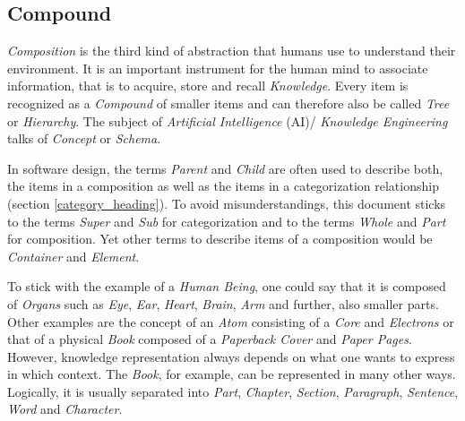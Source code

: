 %
%
%
%
%
%
%

\subsection{Compound}
\label{compound_heading}

\emph{Composition} is the third kind of abstraction that humans use to understand
their environment. It is an important instrument for the human mind to associate
information, that is to acquire, store and recall \emph{Knowledge}. Every item is
recognized as a \emph{Compound} of smaller items and can therefore also be called
\emph{Tree} or \emph{Hierarchy}. The subject of \emph{Artificial Intelligence} (AI)/
\emph{Knowledge Engineering} talks of \emph{Concept} or \emph{Schema}.

In software design, the terms \emph{Parent} and \emph{Child} are often used to
describe both, the items in a composition as well as the items in a categorization
relationship (section \ref{category_heading}).
To avoid misunderstandings, this document sticks to the terms \emph{Super} and
\emph{Sub} for categorization and to the terms \emph{Whole} and \emph{Part}
\cite{sowa} for composition. Yet other terms to describe items of a composition
would be \emph{Container} and \emph{Element}.

To stick with the example of a \emph{Human Being}, one could say that it is
composed of \emph{Organs} such as \emph{Eye}, \emph{Ear}, \emph{Heart},
\emph{Brain}, \emph{Arm} and further, also smaller parts. Other examples are the
concept of an \emph{Atom} consisting of a \emph{Core} and \emph{Electrons} or
that of a physical \emph{Book} composed of a \emph{Paperback Cover} and
\emph{Paper Pages}.
However, knowledge representation always depends on what one wants to express in
which context. The \emph{Book}, for example, can be represented in many other
ways. Logically, it is usually separated into \emph{Part}, \emph{Chapter},
\emph{Section}, \emph{Paragraph}, \emph{Sentence}, \emph{Word} and \emph{Character}.


